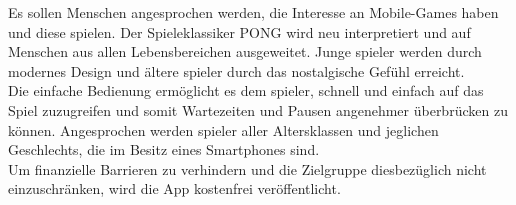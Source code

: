 Es sollen Menschen angesprochen werden, die Interesse an Mobile-Games haben und diese spielen.
Der Spieleklassiker PONG wird neu interpretiert und auf Menschen aus allen Lebensbereichen ausgeweitet.
Junge \gls{spieler} werden durch modernes Design und ältere \gls{spieler} durch das nostalgische Gefühl erreicht.
\\
Die einfache Bedienung ermöglicht es dem \gls{spieler}, schnell und einfach auf das Spiel zuzugreifen 
und somit Wartezeiten und Pausen angenehmer überbrücken zu können.
Angesprochen werden \gls{spieler} aller Altersklassen und jeglichen Geschlechts, die im Besitz eines Smartphones sind.
\\
Um finanzielle Barrieren zu verhindern und die Zielgruppe diesbezüglich nicht einzuschränken, wird die App kostenfrei veröffentlicht.
